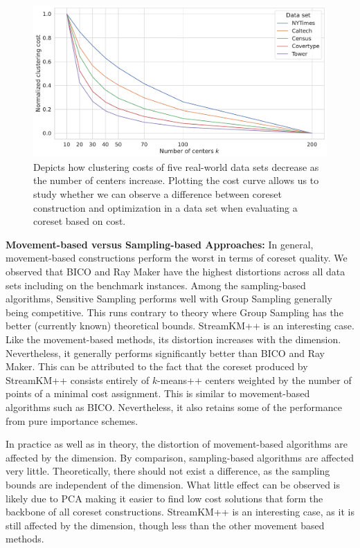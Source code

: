 \begin{figure}
  \centering
  \includegraphics[width=1\linewidth]{figures/cost-curves-real-world-datasets.pdf}
  \caption{Depicts how clustering costs of five real-world data sets decrease as the number of centers increase. 
  Plotting the cost curve allows us to study whether we can observe a difference between coreset construction and optimization in a data set when evaluating a coreset based on cost.
  }
  \label{fig:cost-curves-real-world-datasets}
\end{figure}



{\bf Movement-based versus Sampling-based Approaches:}
In general, movement-based constructions perform the worst in terms of coreset quality. 
We observed that BICO and Ray Maker have the highest distortions across all data sets including on the benchmark instances. Among the sampling-based algorithms, Sensitive Sampling performs well with Group Sampling generally being competitive. This runs contrary to theory where Group Sampling has the better (currently known) theoretical bounds. StreamKM++ is an interesting case. Like the movement-based methods, its distortion increases with the dimension. Nevertheless, it generally performs significantly better than BICO and Ray Maker. This can be attributed to the fact that the coreset produced by StreamKM++ consists entirely of $k$-means++ centers weighted by the number of points of a minimal cost assignment. This is similar to movement-based algorithms such as BICO. Nevertheless, it also retains some of the performance from pure importance schemes.

In practice as well as in theory, the distortion of movement-based algorithms are affected by the dimension. By comparison, sampling-based algorithms are affected very little. Theoretically, there should not exist a difference, as the sampling bounds are independent of the dimension. What little effect can be observed is likely due to PCA making it easier to find low cost solutions that form the backbone of all coreset constructions. StreamKM++ is an interesting case, as it is still affected by the dimension, though less than the other movement based methods.


